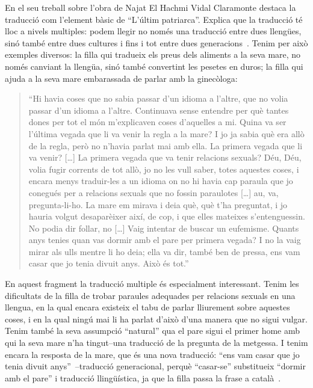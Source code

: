 En el seu treball sobre l'obra de Najat El Hachmi Vidal Claramonte destaca la traducció com l'element bàsic de ``L'últim patriarca''.
Explica que la traducció té lloc a nivels multiples: podem llegir no només una traducció entre dues llengües, sinó també entre dues cultures i fins i tot entre dues generacions~\autocite{Vidal2012}.
Tenim per això exemples diversos:
la filla qui tradueix els preus dels aliments a la seva mare, no només canviant la llengüa, sinó també convertint les pesetes en duros;
la filla qui ajuda a la seva mare embarassada de parlar amb la ginecòloga:
\begin{quote}
``Hi havia coses que no sabia passar d'un idioma a l'altre, que no volia passar d'un idioma a l'altre. Continuava sense entendre per què tantes dones per tot el món m'explicaven coses d'aquelles a mi. Quina va ser l'última vegada que li va venir la regla a la mare? I jo ja sabia què era allò de la regla, però no n'havia parlat mai amb ella. La primera vegada que li va venir? [\ldots] La primera vegada que va tenir relacions sexuals? Déu, Déu, volia fugir corrents de tot allò, jo no les vull saber, totes aquestes coses, i encara menys traduir-les a un idioma on no hi havia cap paraula que jo conegués per a relacions sexuals que no fossin paraulotes [\ldots] au, va, pregunta-li-ho. La mare em mirava i deia què, què t'ha preguntat, i jo hauria volgut desaparèixer així, de cop, i que elles mateixes s'entenguessin. No podia dir follar, no [\ldots] Vaig intentar de buscar un eufemisme. Quants anys tenies quan vas dormir amb el pare per primera vegada? I no la vaig mirar als ulls mentre li ho deia; ella va dir, també ben de pressa, ens vam casar que jo tenia divuit anys. Això és tot.''~\autocite[217]{ElHachmi2008}
\end{quote}
En aquest fragment la traducció multiple és especialment interessant.
Tenim les dificultats de la filla de trobar paraules adequades per relacions sexuals en una llengua, en la qual encara existeix el tabu de parlar lliurement sobre aquestes coses,
i en la qual ningú mai li ha parlat d'això d'una manera que no sigui vulgar.
Tenim també la seva assumpció ``natural'' qua el pare sigui el primer home amb qui la seva mare n'ha tingut--una traducció de la pregunta de la metgessa.
I tenim encara la resposta de la mare, que és una nova traducció: ``ens vam casar que jo tenia divuit anys''~\autocite[217]{ElHachmi2008}--traducció generacional, perquè ``casar-se'' substitueix ``dormir amb el pare'' i traducció llingüística, ja que la filla passa la frase a català~\autocite{Vidal2012}.

